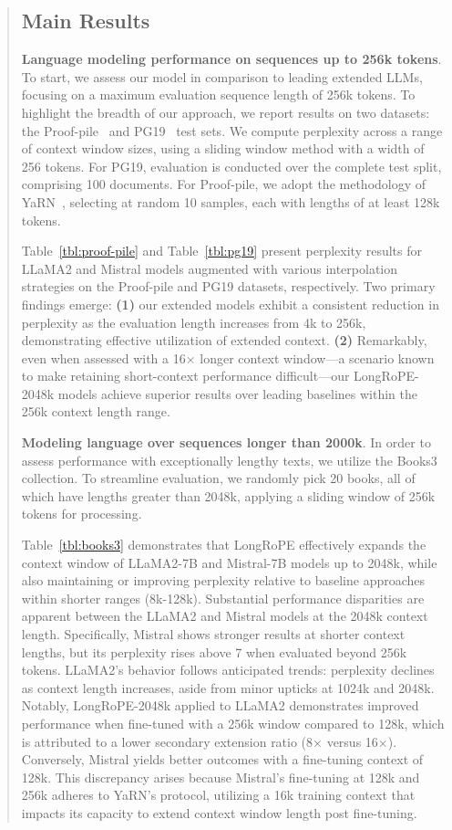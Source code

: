 \begin{abstract}
\subsection{Main Results}

\label{sec:mainresult}
\textbf{Language modeling performance on sequences up to 256k tokens}. To start, we assess our model in comparison to leading extended LLMs, focusing on a maximum evaluation sequence length of 256k tokens. To highlight the breadth of our approach, we report results on two datasets: the Proof-pile~\cite{pg19} and PG19~\cite{pile} test sets. We compute perplexity across a range of context window sizes, using a sliding window method with a width of 256 tokens. For PG19, evaluation is conducted over the complete test split, comprising 100 documents. For Proof-pile, we adopt the methodology of YaRN~\cite{yarn}, selecting at random 10 samples, each with lengths of at least 128k tokens.

Table~\ref{tbl:proof-pile} and Table~\ref{tbl:pg19} present perplexity results for LLaMA2 and Mistral models augmented with various interpolation strategies on the Proof-pile and PG19 datasets, respectively. Two primary findings emerge: \textbf{(1)} our extended models exhibit a consistent reduction in perplexity as the evaluation length increases from 4k to 256k, demonstrating effective utilization of extended context. \textbf{(2)} Remarkably, even when assessed with a 16$\times$ longer context window—a scenario known to make retaining short-context performance difficult—our LongRoPE-2048k models achieve superior results over leading baselines within the 256k context length range.

\textbf{Modeling language over sequences longer than 2000k}. In order to assess performance with exceptionally lengthy texts, we utilize the Books3~\cite{pile} collection. To streamline evaluation, we randomly pick 20 books, all of which have lengths greater than 2048k, applying a sliding window of 256k tokens for processing.

Table~\ref{tbl:books3} demonstrates that LongRoPE effectively expands the context window of LLaMA2-7B and Mistral-7B models up to 2048k, while also maintaining or improving perplexity relative to baseline approaches within shorter ranges (8k-128k). Substantial performance disparities are apparent between the LLaMA2 and Mistral models at the 2048k context length. Specifically, Mistral shows stronger results at shorter context lengths, but its perplexity rises above 7 when evaluated beyond 256k tokens. LLaMA2's behavior follows anticipated trends: perplexity declines as context length increases, aside from minor upticks at 1024k and 2048k. Notably, LongRoPE-2048k applied to LLaMA2 demonstrates improved performance when fine-tuned with a 256k window compared to 128k, which is attributed to a lower secondary extension ratio (8$\times$ versus 16$\times$). Conversely, Mistral yields better outcomes with a fine-tuning context of 128k. This discrepancy arises because Mistral’s fine-tuning at 128k and 256k adheres to YaRN’s protocol, utilizing a 16k training context that impacts its capacity to extend context window length post fine-tuning.


\end{abstract}
